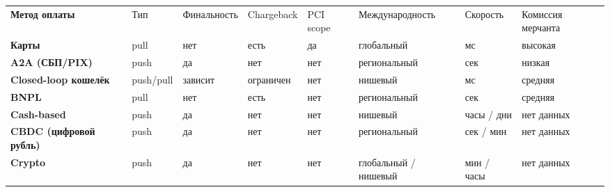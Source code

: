 \documentclass[varwidth=24cm,border=4mm]{standalone}
\begin{document}
\scriptsize
\renewcommand{\arraystretch}{1.16}

\newcommand{\adv}[1]{\cellcolor{Good!14}#1}
\newcommand{\dis}[1]{\cellcolor{Bad!10}#1}
\newcommand{\neu}[1]{\cellcolor{Ink!6}#1}

\begin{tabularx}{22.8cm}{
  >{\raggedright\arraybackslash\bfseries}p{2.8cm}
  >{\raggedright\arraybackslash}p{1.4cm}
  >{\raggedright\arraybackslash}p{1.65cm}
  >{\raggedright\arraybackslash}p{1.55cm}
  >{\raggedright\arraybackslash}p{1.45cm}
  >{\raggedright\arraybackslash}p{2.55cm}
  >{\raggedright\arraybackslash}p{1.8cm}
  >{\raggedright\arraybackslash}p{2.35cm}
}
\rowcolor{Panel}
Метод оплаты & Тип & Финальность & Chargeback & PCI scope & Международность & Скорость & Комиссия мерчанта \\

Карты &
\dis{pull} &
\dis{нет} &
\dis{есть} &
\dis{да} &
\adv{глобальный} &
\adv{мс} &
\dis{высокая} \\

A2A (СБП/PIX) &
\adv{push} &
\adv{да} &
\adv{нет} &
\adv{нет} &
\neu{региональный} &
\adv{сек} &
\adv{низкая} \\

Closed-loop кошелёк &
\neu{push/pull} &
\neu{зависит} &
\neu{ограничен} &
\adv{нет} &
\dis{нишевый} &
\adv{мс} &
\neu{средняя} \\

BNPL &
\dis{pull} &
\dis{нет} &
\dis{есть} &
\neu{нет} &
\neu{региональный} &
\adv{сек} &
\neu{средняя} \\

Cash-based &
\adv{push} &
\adv{да} &
\adv{нет} &
\adv{нет} &
\dis{нишевый} &
\dis{часы / дни} &
\neu{нет данных} \\

CBDC (цифровой рубль) &
\adv{push} &
\adv{да} &
\adv{нет} &
\adv{нет} &
\dis{региональный} &
\neu{сек / мин} &
\neu{нет данных} \\

Crypto &
\adv{push} &
\adv{да} &
\adv{нет} &
\adv{нет} &
\neu{глобальный / нишевый} &
\neu{мин / часы} &
\neu{нет данных} \\
\end{tabularx}

\vspace{4mm}
\end{document}
